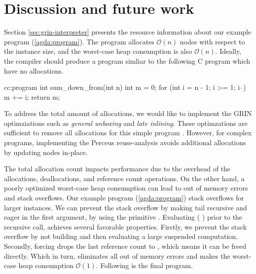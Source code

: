 \documentclass[9pt, twocolumn]{article}
\renewcommand{\AgdaUnderscore}{\texttt{\_}}
\newcommand{\refp}[1]{(\ref{#1})}
\begin{document}

\section{Discussion and future work}
\label{sec:discussion-and-future-work}
Section \ref{sec:grin-interpreter} presents the resource information about our example program \refp{agda:program}. The program allocates $\mathcal{O}(n)$ nodes with respect to the instance size, and the worst-case heap consumption is also $\mathcal{O}(n)$.
Ideally, the compiler should produce a program simliar to the following C program which have no allocations.
\begin{typewriter}{c}{c:program}
int sum_down_from(int n){
  int m = 0;
  for (int i = n - 1; i >= 1; i--) 
    m += i;
  return m;
}
\end{typewriter}

To address the total amount of allocations, we would like to implement the GRIN optimziations such as \emph{general unboxing} and \emph{late inlining}. 
These optimzations are sufficient to remove all allocations for this simple program \citep{boquist1999}.
However, for complex programs, implementing the Perceus reuse-analysis avoids additional allocations by updating nodes \mbox{in-place}. 

The total allocation count impacts performance due to the overhead of the allocations, deallocations, and reference count operations.
On the other hand, a poorly optimized worst-case heap consumption can lead to out of memory errors and stack overflows. 
Our example program \refp{agda:program} stack overflows for larger instances.
We can prevent the stack overflow by making  tail recursive and eager in the first argument, by using the primitive \mbox{}.
Evaluating ( \AgdaFunction{+} ) prior to the recursive call, achieves several favorable properties.
Firstly, we prevent the stack overflow by not building and then evaluating a large suspended computation.
Secondly, forcing \AgdaFunction{\AgdaUnderscore+\AgdaUnderscore} drops the last reference count to , which means it can be freed directly.
Which in turn, eliminates all out of memory errors and makes the worst-case heap consumption $\mathcal{O}(1)$.
Following is the final program.
\end{document}
